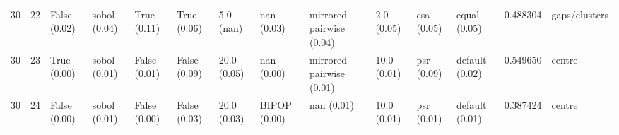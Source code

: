 \begin{tabular}{rlllllllllllrl}
30 & 22 & False (0.02) & sobol (0.04) & True (0.11) & True (0.06) & 5.0 (nan) & nan (0.03) & mirrored pairwise (0.04) & 2.0 (0.05) & csa (0.05) & equal (0.05) & 0.488304 & gaps/clusters \\
30 & 23 & True (0.00) & sobol (0.01) & False (0.01) & False (0.09) & 20.0 (0.05) & nan (0.00) & mirrored pairwise (0.01) & 10.0 (0.01) & psr (0.09) & default (0.02) & 0.549650 & centre \\
30 & 24 & False (0.00) & sobol (0.01) & False (0.00) & False (0.03) & 20.0 (0.03) & BIPOP (0.00) & nan (0.01) & 10.0 (0.01) & psr (0.01) & default (0.01) & 0.387424 & centre \\
\bottomrule
\end{tabular}
